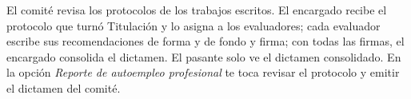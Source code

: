 \documentclass[11pt,a4paper]{article}
\begin{document}
{\small\tableofcontents}
\newpage
\begin{quevasahacer}
El comité revisa los protocolos de los trabajos escritos. El encargado recibe el protocolo que turnó Titulación y lo asigna a los evaluadores; cada evaluador escribe sus recomendaciones de forma y de fondo y firma; con todas las firmas, el encargado consolida el dictamen. El pasante solo ve el dictamen consolidado. En la opción \emph{Reporte de autoempleo profesional} te toca revisar el protocolo y emitir el dictamen del comité.
\end{quevasahacer}



\end{document}
